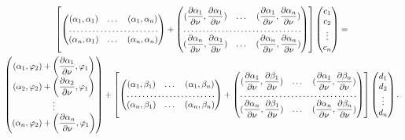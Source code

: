 \documentclass[a4paper, 12pt]{article}
\begin{document}
\begin{multline}
  \left[
    \begin{pmatrix}
      (\alpha_1,\alpha_1) & \dots & (\alpha_1,\alpha_n) \\
      \hdotsfor{3} \\
      (\alpha_n,\alpha_1) & \dots & (\alpha_n,\alpha_n)
      \end{pmatrix}+
      \begin{pmatrix}
      (\dfrac{\partial\alpha_1}{\partial \nu},\dfrac{\partial\alpha_1}{\partial \nu}) & \dots & (\dfrac{\partial\alpha_1}{\partial \nu},\dfrac{\partial\alpha_n}{\partial \nu}) \\
      \hdotsfor{3} \\
      (\dfrac{\partial\alpha_n}{\partial \nu},\dfrac{\partial\alpha_1}{\partial \nu}) & \dots & (\dfrac{\partial\alpha_n}{\partial \nu},\dfrac{\partial\alpha_n}{\partial \nu})
      \end{pmatrix}
  \right]
\begin{pmatrix}
  c_1\\
  c_2\\
  \vdots\\
  c_n
\end{pmatrix}=\\
\begin{pmatrix}
  (\alpha_1,\varphi_2)+\left(\dfrac{\partial \alpha_1}{\partial \nu},\varphi_1\right)\\
  (\alpha_2,\varphi_2)+\left(\dfrac{\partial \alpha_2}{\partial \nu},\varphi_1\right)\\
  \vdots\\
  (\alpha_n,\varphi_2)+\left(\dfrac{\partial \alpha_n}{\partial \nu},\varphi_1\right)
\end{pmatrix}+
\left[
  \begin{pmatrix}
    (\alpha_1,\beta_1) & \dots & (\alpha_1,\beta_n) \\
    \hdotsfor{3} \\
    (\alpha_n,\beta_1) & \dots & (\alpha_n,\beta_n)
    \end{pmatrix}+
    \begin{pmatrix}
    (\dfrac{\partial\alpha_1}{\partial \nu},\dfrac{\partial\beta_1}{\partial \nu}) & \dots & (\dfrac{\partial\alpha_1}{\partial \nu},\dfrac{\partial\beta_n}{\partial \nu}) \\
    \hdotsfor{3} \\
    (\dfrac{\partial\alpha_n}{\partial \nu},\dfrac{\partial\beta_1}{\partial \nu}) & \dots & (\dfrac{\partial\alpha_n}{\partial \nu},\dfrac{\partial\beta_n}{\partial \nu})
    \end{pmatrix}
\right]
\begin{pmatrix}
  d_1\\
  d_2\\
  \vdots\\
  d_n
\end{pmatrix}.
\end{multline}
\end{document}
